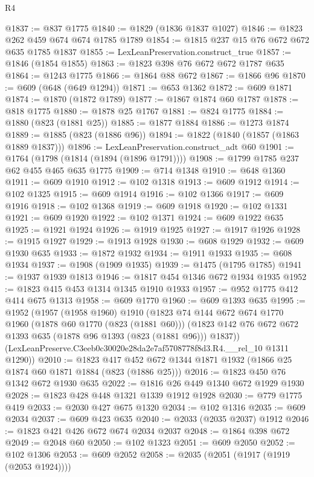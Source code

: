 \begin{lexlean}{R4}
\begin{coremodule}
@1837 := @837 @1775
@1840 := @1829 (@1836 @1837 @1027)
@1846 := @1823 @262 @459 @674 @674 @1785 @1789
@1854 := @1815 @237 @15 @76 @672 @672 @635 @1785 @1837
@1855 := LexLeanPreservation.construct_true
@1857 := @1846 (@1854 @1855)
@1863 := @1823 @398 @76 @672 @672 @1787 @635
@1864 := @1243 @1775
@1866 := @1864 @88 @672
@1867 := @1866 @96
@1870 := @609 (@648 (@649 @1294))
@1871 := @653 @1362
@1872 := @609 @1871
@1874 := @1870 (@1872 @1789)
@1877 := @1867 @1874 @60 @1787
@1878 := @818 @1775
@1880 := @1878 @25 @1767
@1881 := @824 @1775
@1884 := @1880 (@823 (@1881 @25))
@1885 := @1877 @1884
@1886 := @1273 @1874
@1889 := @1885 (@823 (@1886 @96))
@1894 := @1822 (@1840 (@1857 (@1863 @1889 @1837)))
@1896 := LexLeanPreservation.construct_adt @60
@1901 := @1764 (@1798 (@1814 (@1894 (@1896 @1791))))
@1908 := @1799 @1785 @237 @62 @455 @465 @635 @1775
@1909 := @714 @1348
@1910 := @648 @1360
@1911 := @609 @1910
@1912 := @102 @1318
@1913 := @609 @1912
@1914 := @102 @1325
@1915 := @609 @1914
@1916 := @102 @1366
@1917 := @609 @1916
@1918 := @102 @1368
@1919 := @609 @1918
@1920 := @102 @1331
@1921 := @609 @1920
@1922 := @102 @1371
@1924 := @609 @1922 @635
@1925 := @1921 @1924
@1926 := @1919 @1925
@1927 := @1917 @1926
@1928 := @1915 @1927
@1929 := @1913 @1928
@1930 := @608 @1929
@1932 := @609 @1930 @635
@1933 := @1872 @1932
@1934 := @1911 @1933
@1935 := @608 @1934
@1937 := @1908 (@1909 @1935)
@1939 := @1475 (@1795 @1785)
@1941 := @1937 @1939 @1813
@1946 := @1817 @454 @1346 @672 @1934 @1935
@1952 := @1823 @415 @453 @1314 @1345 @1910 @1933
@1957 := @952 @1775 @412 @414 @675 @1313
@1958 := @609 @1770
@1960 := @609 @1393 @635
@1995 := @1952
    (@1957
      (@1958 @1960)
      @1910
      (@1823
        @74
        @144
        @672
        @674
        @1770
        @1960
        (@1878 @60 @1770 (@823 (@1881 @60)))
        (@1823 @142 @76 @672 @672 @1393 @635 (@1878 @96 @1393 (@823 (@1881 @96))) @1837))
      (LexLeanPreserve.C3eeb0c30020e28da2e7af5708778f8d3.R4.__rel_10 @1311 @1290))
@2010 := @1823 @417 @452 @672 @1344 @1871 @1932 (@1866 @25 @1874 @60 @1871 @1884 (@823 (@1886 @25)))
@2016 := @1823 @450 @76 @1342 @672 @1930 @635
@2022 := @1816 @26 @449 @1340 @672 @1929 @1930
@2028 := @1823 @428 @448 @1321 @1339 @1912 @1928
@2030 := @779 @1775 @419
@2033 := @2030 @427 @675 @1320
@2034 := @102 @1316
@2035 := @609 @2034
@2037 := @609 @423 @635
@2040 := @2033 (@2035 @2037) @1912
@2046 := @1823 @421 @426 @672 @674 @2034 @2037
@2048 := @1864 @398 @672
@2049 := @2048 @60
@2050 := @102 @1323
@2051 := @609 @2050
@2052 := @102 @1306
@2053 := @609 @2052
@2058 := @2035 (@2051 (@1917 (@1919 (@2053 @1924))))

\end{coremodule}
\end{lexlean}
